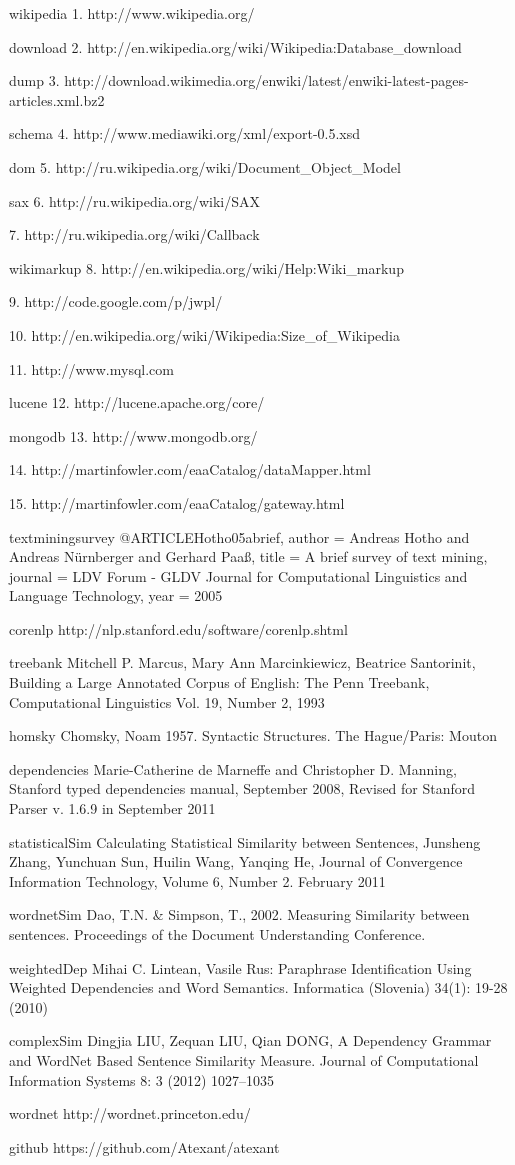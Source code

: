 
wikipedia
1. http://www.wikipedia.org/

download
2. http://en.wikipedia.org/wiki/Wikipedia:Database_download

dump
3. http://download.wikimedia.org/enwiki/latest/enwiki-latest-pages-articles.xml.bz2

schema
4. http://www.mediawiki.org/xml/export-0.5.xsd

dom
5. http://ru.wikipedia.org/wiki/Document_Object_Model

sax
6. http://ru.wikipedia.org/wiki/SAX

7. http://ru.wikipedia.org/wiki/Callback

wikimarkup
8. http://en.wikipedia.org/wiki/Help:Wiki_markup

9. http://code.google.com/p/jwpl/

10. http://en.wikipedia.org/wiki/Wikipedia:Size_of_Wikipedia

11. http://www.mysql.com

lucene
12. http://lucene.apache.org/core/

mongodb
13. http://www.mongodb.org/

14. http://martinfowler.com/eaaCatalog/dataMapper.html

15. http://martinfowler.com/eaaCatalog/gateway.html

textminingsurvey
@ARTICLE{Hotho05abrief,
    author = {Andreas Hotho and Andreas Nürnberger and Gerhard Paaß},
    title = {A brief survey of text mining},
    journal = {LDV Forum - GLDV Journal for Computational Linguistics and Language Technology},
    year = {2005}
}

corenlp
http://nlp.stanford.edu/software/corenlp.shtml

treebank
Mitchell  P. Marcus, Mary Ann Marcinkiewicz, Beatrice Santorinit, Building a Large Annotated Corpus of English: The Penn Treebank, Computational Linguistics Vol. 19, Number 2, 1993

homsky
Chomsky, Noam 1957. Syntactic Structures. The Hague/Paris: Mouton

dependencies
Marie-Catherine de Marneffe and Christopher D. Manning, Stanford typed dependencies manual, September 2008, Revised for Stanford Parser v. 1.6.9 in September 2011

statisticalSim
Calculating Statistical Similarity between Sentences, Junsheng Zhang, Yunchuan Sun, Huilin Wang, Yanqing He, Journal of Convergence Information Technology, Volume 6, Number 2. February 2011

wordnetSim
Dao, T.N. & Simpson, T., 2002. Measuring Similarity between sentences. Proceedings of the Document Understanding Conference. 

weightedDep
Mihai C. Lintean, Vasile Rus: Paraphrase Identification Using Weighted Dependencies and Word Semantics. Informatica (Slovenia) 34(1): 19-28 (2010)

complexSim
Dingjia LIU, Zequan LIU, Qian DONG, A Dependency Grammar and WordNet Based Sentence Similarity Measure. Journal of Computational Information Systems 8: 3 (2012) 1027–1035

wordnet
http://wordnet.princeton.edu/

github
https://github.com/Atexant/atexant
